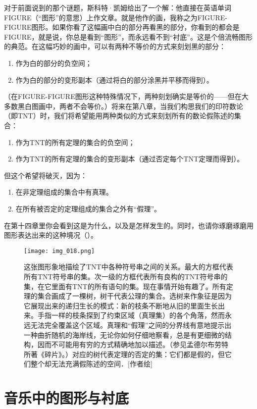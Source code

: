 对于前面说到的那个谜题，斯科特·凯姆给出了一个解：他直接在英语单词FIGURE（“图形”的意思）上作文章。就是他作的画，我称之为FIGURE-FIGURE图形。如果你看了这幅画中白的部分再看黑的部分，你看到的都会是FIGURE，就是说，你总是看到“图形”，而永远看不到“衬底”。这是个倍流畅图形的典范。在这幅巧妙的画中，可以有两种不等价的方式来刻划黑的部分：
\begin{enumerate}
\item 作为白的部分的负空间；
\item 作为白的部分的变形副本（通过将白的部分涂黑并平移而得到）。
\end{enumerate}
（在FIGURE-FIGURE图形这种特殊情况下，两种刻划确实是等价的——但在大多数黑白图画中，两者不会等价。）将来在第八章，当我们构思我们的印符数论（即TNT）时，我们将希望能用两种类似的方式来刻划所有的数论假陈述的集合：
\begin{enumerate}
\item 作为TNT的所有定理的集合的负空间；
\item 作为TNT的所有定理的集合的变形副本（通过否定每个TNT定理而得到）。
\end{enumerate}
但这个希望将破灭，因为：
\begin{enumerate}
\item 在非定理组成的集合中有真理。
\item 在所有被否定的定理组成的集合之外有“假理”。
\end{enumerate}
在第十四章里你会看到这是为什么，以及是怎样发生的。同时，也请你琢磨琢磨用图形表达出来的这种境况（）。

\begin{figure}
\texttt{[image: img\_018.png]}
\caption[各类串之间的关系图示。]
  {这张图形象地描绘了TNT中各种符号串之间的关系。最大的方框代表所有TNT符号串的集。次一级的方框代表所有良构的TNT符号串的集，在它里面有TNT的所有语句的集。现在事情开始有趣了。所有定理的集合画成了一棵树，树干代表公理的集合。选树来作象征是因为它展现出来的递归生长的模式：新的枝条不断地从旧的里面生长出来。手指一样的枝条探到了约束区域（真理集）的各个角落，然而永远无法完全覆盖这个区域。真理和“假理”之间的分界线有意地提示出一种曲折随机的海岸线，无论你如何仔细地察看，总是有更细微的结构，因而不可能用有穷的方式精确地加以描述。（参见孟德尔布劳特所著《碎片》。）对应的树代表定理的否定的集：它们都是假的，但它们整个却无法充满假陈述的空间．[作者绘]}
\end{figure}

\section{音乐中的图形与衬底}

